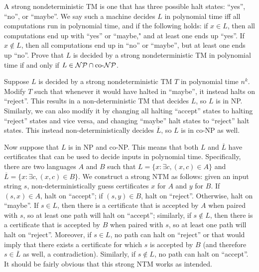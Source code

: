 \documentclass[solution, letterpaper]{cs121}
\begin{document}
        

\newcommand{\CoNP}{ \text{co-}{\cal NP}}
A strong nondeterministic TM is one that has three possible
halt states:  ``yes'', ``no'', or ``maybe''.  We say such a machine decides $L$ in
polynomial time iff all computations run in polynomial time, and if the
following holds: if $x\in L$, then all computations end up with ``yes'' or
``maybe," and at least one ends up ``yes''.  If $x\notin L$, then all
computations end up in ``no'' or ``maybe'', but at least one ends up ``no''.
Prove that $L$ is decided by a strong nondeterministic TM in polynomial time
if and only if $L\in{\cal NP}\cap\CoNP$.

\begin{solution}
Suppose $L$ is decided by a strong nondeterministic TM $T$ in polynomial time $n^k$.  Modify $T$ such that whenever it would have halted in ``maybe'', it instead halts on ``reject''.  This results in a non-deterministic TM that decides $L$, so $L$ is in NP.  Similarly, we can also modify it by changing all halting ``accept'' states to halting ``reject'' states and vice versa, and changing ``maybe'' halt states to ``reject'' halt states.  This instead non-deterministically decides $\overline{L}$, so $L$ is in co-NP as well.

Now suppose that $L$ is in NP and co-NP.  This means that both $L$ and $\overline{L}$ have certificates that can be used to decide inputs in polynomial time.  Specifically, there are two languages $A$ and $B$ such that $L = \{x: \exists c, (x,c) \in A\}$ and $\overline{L} = \{x: \exists c, (x,c) \in B\}$.  We construct a strong NTM as follows: given an input string $s$, non-deterministically guess certificates $x$ for $A$ and $y$ for $B$.  If $(s,x) \in A$, halt on ``accept''; if $(s,y) \in B$, halt on ``reject''.  Otherwise, halt on ``maybe''.  If $s \in L$, then there is a certificate that is accepted by $A$ when paired with $s$, so at least one path will halt on ``accept''; similarly, if $s \notin L$, then there is a certificate that is accepted by $B$ when paired with $s$, so at least one path will halt on ``reject''.  Moreover, if $s \in L$, no path can halt on ``reject'' or that would imply that there exists a certificate for which $s$ is accepted by $B$ (and therefore $s \in \overline{L}$ as well, a contradiction).  Similarly, if $s \notin L$, no path can halt on ``accept''.  It should be fairly obvious that this strong NTM works as intended.
\end{solution}
\end{document}
